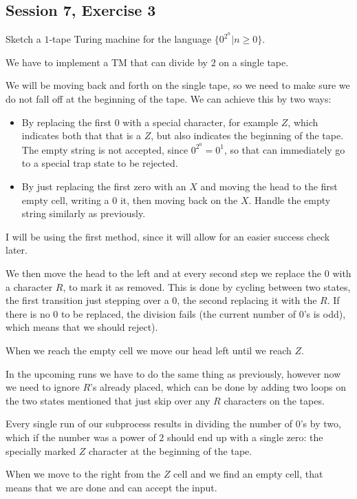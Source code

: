 \subsection {Session 7, Exercise 3}


Sketch a $1$-tape Turing machine for the language $\{0^{2^n} | n \geq{} 0\}$.


We have to implement a TM that can divide by $2$ on a single tape.

We will be moving back and forth on the single tape, so we need to make sure we do not fall off
at the beginning of the tape. We can achieve this by two ways:

\begin{itemize}
    \item By replacing the first $0$ with a special character, for example $Z$, which indicates both that that is a $Z$, but also indicates the beginning of the tape. The empty string is not accepted, since $0^{2^0} = 0^1$, so that can immediately go to a special trap state to be rejected.
    \item By just replacing the first zero with an $X$ and moving the head to the first empty cell, writing a $0$ it, then moving back on the $X$. Handle the empty string similarly as previously.
\end{itemize}

I will be using the first method, since it will allow for an easier success check later.

We then move the head to the left and at every second step we replace the $0$ with a character $R$, to mark it as removed. This is done by cycling between two states, the first transition just stepping over a $0$, the second replacing it with the $R$. If there is no $0$ to be replaced, the division fails (the current number of $0$'s is odd), which means that we should reject).

When we reach the empty cell we move our head left until we reach $Z$.

In the upcoming runs we have to do the same thing as previously, however now we need to ignore $R$'s already placed, which can be done by adding two loops on the two states mentioned that just skip over any $R$ characters on the tapes.

Every single run of our subprocess results in dividing the number of $0$'s by two, which if the number was a power of $2$ should end up with a single zero: the specially marked $Z$ character at the beginning of the tape.

When we move to the right from the $Z$ cell and we find an empty cell, that means that we are done and can accept the input.
